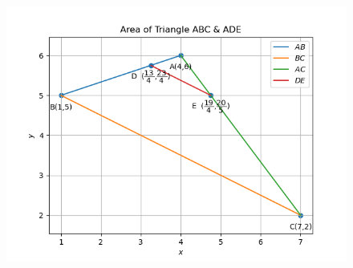 \documentclass[12pt]{article}
\begin{document}
\begin{enumerate}
\begin{figure}[!h]
 \begin{center}
 \includegraphics[width=\columnwidth]{figs/fig.png}
 \end{center}
\caption{}
\label{fig:Fig1}
\end{figure}
\end{enumerate}
\end{document}
